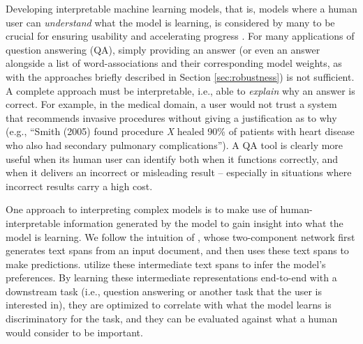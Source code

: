 Developing interpretable machine learning models, that is, models where a human user can \emph{understand} what the model is learning, is considered by many to be crucial for ensuring usability and accelerating progress \citep{craven1996extracting,Kim2015MindTG, letham2015interpretable, Ribeiro2016WhySI}.  
For many applications of question answering (QA), simply providing an answer (or even an answer alongside a list of word-associations and their corresponding model weights, as with the approaches briefly described in Section \ref{sec:robustness}) is not sufficient. A complete approach must be interpretable, i.e., able to {\em explain} why an answer is correct. 
For example, in the medical domain, a user would not trust a system that recommends invasive procedures without giving a justification as to why (e.g., ``Smith (2005) found procedure \emph{X} healed 90\% of patients with heart disease who also had secondary pulmonary complications'').  A QA tool is clearly more useful when its human user can identify both when it functions correctly, and when it delivers an incorrect or misleading result -- especially in situations where incorrect results carry a high cost.  

One approach to interpreting complex models is to make use of human-interpretable information generated by the model to gain insight into what the model is learning.  
We follow the intuition of \citet{Lei2016RationalizingNP}, whose two-component network first generates text spans from an input document, and then uses these text spans to make predictions.   \citeauthor{Lei2016RationalizingNP} utilize these intermediate text spans to infer the model's preferences.
By learning these intermediate representations end-to-end with a downstream task (i.e., question answering or another task that the user is interested in), they are optimized to correlate with what the model learns is discriminatory for the task, and they can be evaluated against what a human would consider to be important.  

